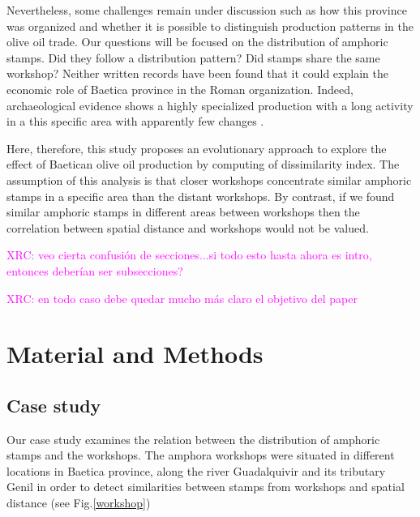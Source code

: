 \documentclass[review]{elsarticle}
\newcommand{\memo}[2]{\textcolor{#1}{#2}}
\newcommand{\xavi}[1]{\memo{magenta}{XRC: #1\\}}
\begin{document}
Nevertheless, some challenges remain under discussion such as how this province was organized and whether it is possible to distinguish production patterns in the olive oil trade. Our questions will be focused on the distribution of amphoric stamps. Did they follow a distribution pattern? Did stamps share the same workshop? Neither written records have been found that it could explain the economic role of Baetica province in the Roman organization. Indeed, archaeological evidence shows a highly specialized production with a long activity in a this specific area with apparently few changes \citep{remesal_anforas_2004}. 

Here, therefore, this study proposes an evolutionary approach to explore the effect of Baetican olive oil production by computing of dissimilarity index. The assumption of this analysis is that closer workshops concentrate similar amphoric stamps in a specific area than the distant workshops. By contrast, if we found similar amphoric stamps in different areas between workshops then the correlation between spatial distance and workshops would not be valued.  




\xavi{veo cierta confusión de secciones...si todo esto hasta ahora es intro, entonces deberían ser subsecciones?}

\xavi{en todo caso debe quedar mucho más claro el objetivo del paper}

\section{Material and Methods}

\subsection{Case study}

Our case study examines the relation between the distribution of amphoric stamps and the workshops. The amphora workshops were situated in different locations in Baetica province, along the river Guadalquivir and its tributary Genil in order to detect similarities between stamps from workshops and spatial distance (see Fig.\ref{workshop})
\end{document}
